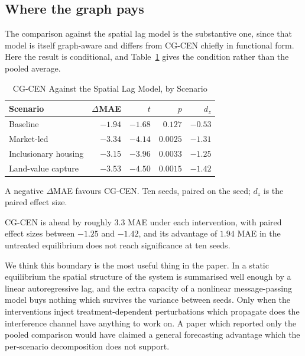 \documentclass[journal]{IEEEtran}
\newcommand{\CGCEN}{CG\mbox{-}CEN}
\begin{document}
\subsection{Where the graph pays}

The comparison against the spatial lag model is the substantive one, since that
model is itself graph-aware and differs from \CGCEN{} chiefly in functional
form. Here the result is conditional, and Table~\ref{tab:vs-slm} gives the
condition rather than the pooled average.

\begin{table}[!t]
\renewcommand{\arraystretch}{1.2}
\caption{\CGCEN{} Against the Spatial Lag Model, by Scenario}
\label{tab:vs-slm}
\centering
\begin{tabular}{lrrrr}
\toprule
\textbf{Scenario} & $\Delta$\textbf{MAE} & $t$ & $p$ & $d_z$ \\
\midrule
Baseline              & $-1.94$ & $-1.68$ & $0.127$  & $-0.53$ \\
Market-led            & $-3.34$ & $-4.14$ & $0.0025$ & $-1.31$ \\
Inclusionary housing  & $-3.15$ & $-3.96$ & $0.0033$ & $-1.25$ \\
Land-value capture    & $-3.53$ & $-4.50$ & $0.0015$ & $-1.42$ \\
\bottomrule
\end{tabular}

\vspace{2pt}
\begin{minipage}{\columnwidth}
\footnotesize A negative $\Delta$MAE favours \CGCEN{}. Ten seeds, paired on the
seed; $d_z$ is the paired effect size.
\end{minipage}
\end{table}

\CGCEN{} is ahead by roughly $3.3$ MAE under each intervention, with paired
effect sizes between $-1.25$ and $-1.42$, and its advantage of $1.94$ MAE in the
untreated equilibrium does not reach significance at ten seeds.

We think this boundary is the most useful thing in the paper. In a static
equilibrium the spatial structure of the system is summarised well enough by a
linear autoregressive lag, and the extra capacity of a nonlinear message-passing
model buys nothing which survives the variance between seeds. Only when the
interventions inject treatment-dependent perturbations which propagate does the
interference channel have anything to work on. A paper which reported only the
pooled comparison would have claimed a general forecasting advantage which the
per-scenario decomposition does not support.
\end{document}
